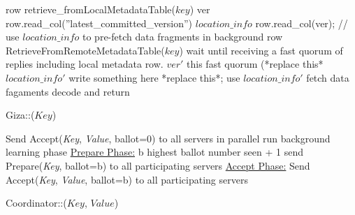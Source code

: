 \begin{algorithm}
  \DontPrintSemicolon
  row \LAR retrieve\_fromLocalMetadataTable($key$) \;
  ver \LAR row.read\_col(''latest\_committed\_version'')\;
  $location\_info$ \LAR row.read\_col(ver); \;
  // use $location\_info$ to pre-fetch data fragments in background \;
   {
    row \LAR RetrieveFromRemoteMetadataTable($key$)
  }
  wait until receiving a fast quorum of replies including local metadata row. \;
   {
    $ver'$ \LAR this fast quorum (*replace this* \;
     {
      $location\_info'$ \LAR write something here *replace this*; \;
      use $location\_info'$ \LAR fetch data fagaments
      decode and return
    }  
  }
  
  \caption{Giza::($Key$)}
\end{algorithm}

\begin{algorithm}
  \DontPrintSemicolon
  Send Accept({\em Key}, {\em Value}, ballot=0) to all servers in parallel\;
   {
    run background learning phase\;
    \;
  } 
  \underline{Prepare Phase:}\;
  b \LAR highest ballot number seen + 1\;
  send Prepare({\em Key}, ballot=b) to all participating servers\;
   
  \underline{Accept Phase:}\;
  Send Accept({\em Key}, {\em Value}, ballot=b) to all participating servers\;
   
 
  \caption{Coordinator::($Key$, $Value$) }
  \label{alg:coordinator}
\end{algorithm}



